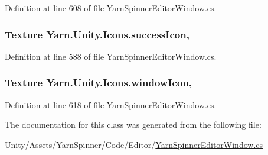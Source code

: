 Definition at line 608 of file Yarn\-Spinner\-Editor\-Window.\-cs.

\hypertarget{a00113_aec8aea03eb6e31771ebc98e0611fff79}{
\subsubsection[{success\-Icon}]{\setlength{\rightskip}{0pt plus 5cm}Texture Yarn.\-Unity.\-Icons.\-success\-Icon\hspace{0.3cm}{\ttfamily [static]}, {\ttfamily [get]}}}\label{a00113_aec8aea03eb6e31771ebc98e0611fff79}


Definition at line 588 of file Yarn\-Spinner\-Editor\-Window.\-cs.

\hypertarget{a00113_aa78ab016ad041bc36850c8b20ba63972}{
\subsubsection[{window\-Icon}]{\setlength{\rightskip}{0pt plus 5cm}Texture Yarn.\-Unity.\-Icons.\-window\-Icon\hspace{0.3cm}{\ttfamily [static]}, {\ttfamily [get]}}}\label{a00113_aa78ab016ad041bc36850c8b20ba63972}


Definition at line 618 of file Yarn\-Spinner\-Editor\-Window.\-cs.



The documentation for this class was generated from the following file\-:\begin{DoxyCompactItemize}
\item 
Unity/\-Assets/\-Yarn\-Spinner/\-Code/\-Editor/\hyperlink{a00296}{Yarn\-Spinner\-Editor\-Window.\-cs}\end{DoxyCompactItemize}
